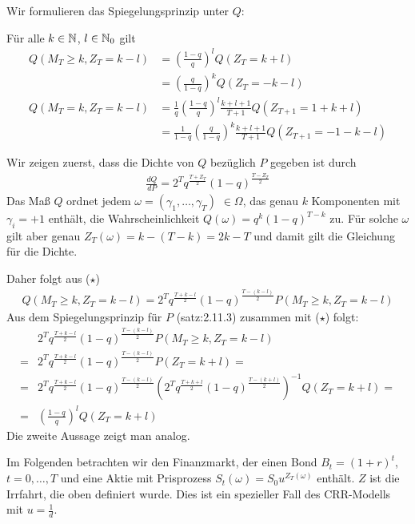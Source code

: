 \documentclass[a4paper,twoside,DIV15,BCOR12mm]{scrbook}
\begin{document}
Wir formulieren das Spiegelungsprinzip unter $Q$:

\begin{satz}
\label{satz:2.11.4}
Für alle $k\in \mathbb{N}$, $l\in\mathbb{N}_0$ gilt
\begin{align*}
Q(M_T\ge k, Z_T=k-l)&=\left(\frac{1-q}{q}\right)^l Q(Z_T=k+l)  \\
&=\left(\frac{q}{1-q}\right)^k Q(Z_T=-k-l)\\
Q(M_T=k,Z_T=k-l)&=\frac{1}{q} \left(\frac{1-q}{q}\right)^l \frac{k+l+1}{T+1} Q(Z_{T+1}=1+k+l)\\
&=\frac{1}{1-q} \left(\frac{q}{1-q}\right)^k \frac{k+l+1}{T+1} Q(Z_{T+1}=-1-k-l)
\end{align*}
\end{satz}
\begin{beweis}
Wir zeigen zuerst, dass die Dichte von $Q$ bezüglich $P$ gegeben ist durch 
\begin{align*}
\frac{dQ}{dP}=2^T q^{\frac{T+Z_T}{2}}(1-q)^{\frac{T-Z_T}{2}} \tag{$\star$}
 \end{align*}
Das Maß $Q$ ordnet jedem $\omega=(\gamma_1,\ldots,\gamma_T)$ $\in\Omega$, das genau $k$ Komponenten mit $\gamma_i=+1$ enthält, die Wahrscheinlichkeit $Q(\omega)=q^k(1-q)^{T-k}$ zu. Für solche $\omega$ gilt aber genau $Z_T(\omega)=k-(T-k)=2k-T$ und damit gilt die Gleichung für die Dichte.

Daher folgt aus ($\star$) 
\begin{align*}
Q(M_T\ge k,Z_T=k-l)=2^T q^{\frac{T+k-l}{2}}(1-q)^{\frac{T-(k-l)}{2}}P(M_T\ge k,Z_T=k-l)
\end{align*} 
Aus dem Spiegelungsprinzip für $P$ (satz:2.11.3) zusammen mit ($\star$) folgt:
\begin{align*}
&2^T q^{\frac{T+k-l}{2}}(1-q)^{\frac{T-(k-l)}{2}}P(M_T\ge k,Z_T=k-l)\\
=& 2^T q^{\frac{T+k-l}{2}}(1-q)^{\frac{T-(k-l)}{2}}P(Z_T=k+l)=\\
=&2^T q^{\frac{T+k-l}{2}}(1-q)^{\frac{T-(k-l)}{2}}(2^T q^{\frac{T+k+l}{2}}(1-q)^{\frac{T-(k+l)}{2}})^{-1}Q(Z_T=k+l)=\\
=&\left(\frac{1-q}{q}\right)^l Q(Z_T=k+l)
\end{align*}
Die zweite Aussage zeigt man analog.
\end{beweis}
Im Folgenden betrachten wir den Finanzmarkt, der einen Bond $B_t=(1+r)^t$, $t=0,\ldots,T$ und eine Aktie mit Prisprozess $S_t(\omega)=S_0u^{Z_T(\omega)}$ enthält. $Z$ ist die Irrfahrt, die oben definiert wurde. Dies ist ein spezieller Fall des CRR-Modells mit $u=\frac {1}{d}$.
\end{document}
